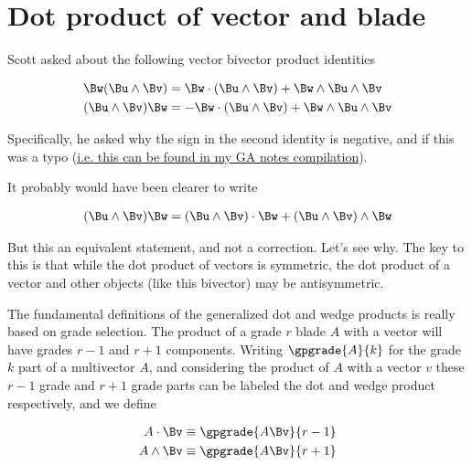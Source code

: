 

\chapter{Dot product of vector and blade}
\label{chap:dotBlade}
{}
\date{Aug 11, 2009}

\beginArtNoToc

Scott asked about the following vector bivector product identities

\begin{align}
\Bw (\Bu \wedge \Bv) &= \Bw \cdot (\Bu \wedge \Bv) + \Bw \wedge \Bu \wedge \Bv \\
(\Bu \wedge \Bv) \Bw &= - \Bw \cdot (\Bu \wedge \Bv) + \Bw \wedge \Bu \wedge \Bv
\end{align}

Specifically, he asked why the sign in the second identity is negative, and if this was a typo (\href{http://sites.google.com/site/peeterjoot/math2009/gabook.pdf}{i.e. this can be found in my GA notes compilation}).

It probably would have been clearer to write

\begin{align*}
(\Bu \wedge \Bv) \Bw = (\Bu \wedge \Bv) \cdot \Bw + (\Bu \wedge \Bv) \wedge \Bw
\end{align*}

But this an equivalent statement, and not a correction.  Let's see why.  The key to this is that while the dot product of vectors is symmetric, the dot product of a vector and other objects (like this bivector) may be antisymmetric.

The fundamental definitions of the generalized dot and wedge products is really based on grade selection.  The product of a grade $r$ blade $A$ with a vector will have grades $r-1$ and $r+1$ components.  Writing $\gpgrade{A}{k}$ for the grade $k$ part of a multivector $A$, and considering the product of $A$ with a vector $v$ these $r-1$ grade and $r+1$ grade parts can be labeled the dot and wedge product respectively, and we define

\begin{align}\label{eqn:dotWedgeDefined}
A \cdot \Bv &\equiv \gpgrade{A \Bv}{r-1} \\
A \wedge \Bv &\equiv \gpgrade{A \Bv}{r+1} 
\end{align}

